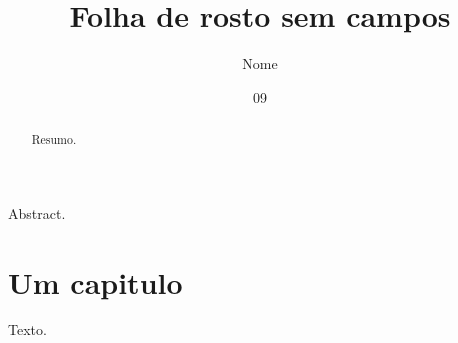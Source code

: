 \documentclass[dsc]{ufrj}
\title{Folha de rosto sem campos}
\author{Nome}{Sobrenome}
\date{09}{2026}
\begin{document}
  \maketitle
  \frontmatter
  \begin{abstract}Resumo.\end{abstract}
  \begin{foreignabstract}Abstract.\end{foreignabstract}
  \tableofcontents
  \mainmatter
  \chapter{Um capitulo}
  Texto.
\end{document}
